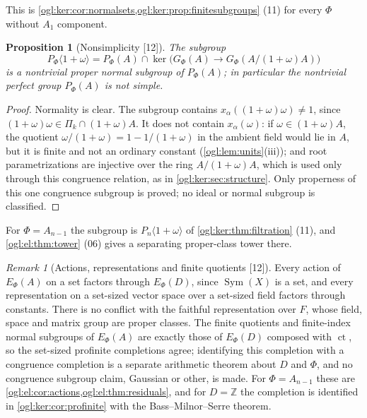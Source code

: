 \documentclass[11pt,oneside]{article}
\numberwithin{equation}{section}
\newtheorem{proposition}[proposition]{Proposition}
\theoremstyle{definition}
\theoremstyle{remark}
\newtheorem{remark}[remark]{Remark}
\newcommand{\Z}{\mathbb Z}
\newcommand{\ct}{\operatorname{ct}}
\newcommand{\Sym}{\operatorname{Sym}}
\newcommand{\src}[1]{\textup{\textsf{\small[#1]}}}
\begin{document}
This is \cref{ogl:ker:cor:normalsets,ogl:ker:prop:finitesubgroups} (11) for every
$\Phi$ without $A_1$ component.

\begin{proposition}[Nonsimplicity \src{12}]\label{ogl:ch:prop:nonsimple}
The subgroup
\[
 P_\Phi\langle1+\omega\rangle=P_\Phi(A)\cap\ker\bigl(G_\Phi(A)\to G_\Phi(A/(1+\omega)A)\bigr)
\]
is a nontrivial proper normal subgroup of $P_\Phi(A)$; in particular the
nontrivial perfect group $P_\Phi(A)$ is not simple.
\end{proposition}
\begin{proof}
Normality is clear. The subgroup contains $x_\alpha((1+\omega)\omega)\ne1$, since
$(1+\omega)\omega\in\Pi_k\cap(1+\omega)A$. It does not contain $x_\alpha(\omega)$: if
$\omega\in(1+\omega)A$, the quotient $\omega/(1+\omega)=1-1/(1+\omega)$ in the
ambient field would lie in $A$, but it is finite and not an ordinary constant
(\cref{ogl:lem:units}(iii)); and root parametrizations are injective over the
ring $A/(1+\omega)A$, which is used only through this congruence relation, as in
\cref{ogl:ker:sec:structure}. Only properness of this one congruence subgroup
is proved; no ideal or normal subgroup is classified.
\end{proof}

For $\Phi=A_{n-1}$ the subgroup is $P_n\langle1+\omega\rangle$ of
\cref{ogl:ker:thm:filtration} (11), and \cref{ogl:el:thm:tower} (06) gives a
separating proper-class tower there.

\begin{remark}[Actions, representations and finite quotients \src{12}]\label{ogl:ch:rem:actions}
Every action of $E_\Phi(A)$ on a set factors through $E_\Phi(D)$, since
$\Sym(X)$ is a set, and every representation on a set-sized vector space over a
set-sized field factors through constants. There is no conflict with the
faithful representation over $F$, whose field, space and matrix group are
proper classes. The finite quotients and finite-index normal subgroups of
$E_\Phi(A)$ are exactly those of $E_\Phi(D)$ composed with $\ct$, so the
set-sized profinite completions agree; identifying this completion with a
congruence completion is a separate arithmetic theorem about $D$ and $\Phi$,
and no congruence subgroup claim, Gaussian or other, is made. For
$\Phi=A_{n-1}$ these are \cref{ogl:el:cor:actions,ogl:el:thm:residuals}, and for
$D=\Z$ the completion is identified in \cref{ogl:ker:cor:profinite} with the
Bass--Milnor--Serre theorem.
\end{remark}
\end{document}

